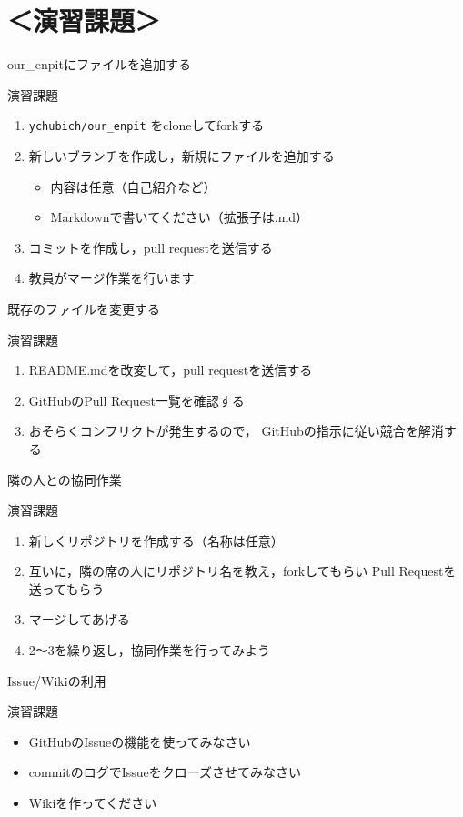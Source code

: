 \documentclass[t, aspectratio=169]{beamer}
\begin{document}
\section{＜演習課題＞}
\label{sec-4-4}
\begin{frame}[fragile,label=sec-4-4-1]{our\_enpitにファイルを追加する}
 \begin{block}{演習課題}
\begin{enumerate}
\item \texttt{ychubich/our\_enpit} をcloneしてforkする
\item 新しいブランチを作成し，新規にファイルを追加する
\begin{itemize}
\item 内容は任意（自己紹介など）
\item Markdownで書いてください（拡張子は.md）
\end{itemize}
\item コミットを作成し，pull requestを送信する
\item 教員がマージ作業を行います
\end{enumerate}
\end{block}
\end{frame}
\begin{frame}[label=sec-4-4-2]{既存のファイルを変更する}
\begin{block}{演習課題}
\begin{enumerate}
\item README.mdを改変して，pull requestを送信する
\item GitHubのPull Request一覧を確認する
\item おそらくコンフリクトが発生するので，
GitHubの指示に従い競合を解消する
\end{enumerate}
\end{block}
\end{frame}
\begin{frame}[label=sec-4-4-3]{隣の人との協同作業}
\begin{block}{演習課題}
\begin{enumerate}
\item 新しくリポジトリを作成する（名称は任意）
\item 互いに，隣の席の人にリポジトリ名を教え，forkしてもらい
Pull Requestを送ってもらう
\item マージしてあげる
\item 2〜3を繰り返し，協同作業を行ってみよう
\end{enumerate}
\end{block}
\end{frame}
\begin{frame}[label=sec-4-4-4]{Issue/Wikiの利用}
\begin{block}{演習課題}
\begin{itemize}
\item GitHubのIssueの機能を使ってみなさい
\item commitのログでIssueをクローズさせてみなさい
\item Wikiを作ってください
\end{itemize}
\end{block}
\end{frame}
\end{document}
